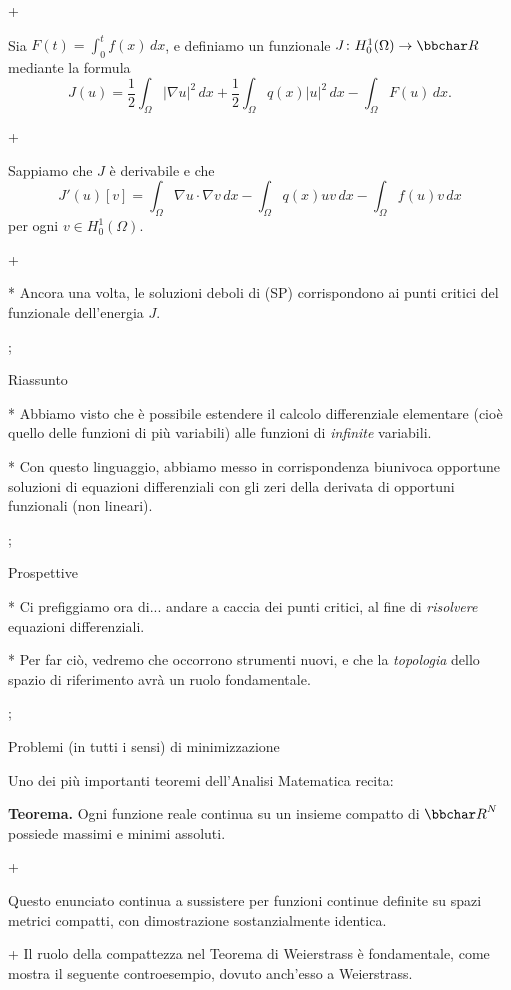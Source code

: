\pg+

Sia $F(t) = \int_0^t f(x)\, dx$, e definiamo un funzionale $J \colon
H_0^1(\Omega) \to \R$ mediante la formula
$$
J(u) = \frac{1}{2} \int_\Omega |\nabla u|^2 \, dx + \frac12
\int_\Omega q(x)|u|^2 \, dx - \int_\Omega F(u)\, dx.
$$

\pg+

Sappiamo che $J$ \`e derivabile e che
$$
J'(u)[v] = \int_\Omega \nabla u \cdot \nabla v \, dx - \int_\Omega
q(x) uv\, dx - \int_\Omega f(u)v\, dx
$$
per ogni $v \in H_0^1(\Omega)$.

\pg+

* Ancora una volta, le soluzioni deboli di (SP) corrispondono ai punti
  critici del funzionale dell'energia $J$.

\pg;

\sec Riassunto

* Abbiamo visto che \`e possibile estendere il calcolo differenziale
elementare (cio\`e quello delle funzioni di pi\`u variabili) alle
funzioni di {\em infinite} variabili.

* Con questo linguaggio, abbiamo messo in corrispondenza biunivoca
  opportune soluzioni di equazioni differenziali con gli zeri della
  derivata di opportuni funzionali (non lineari).

\pg;

\sec Prospettive

* Ci prefiggiamo ora di... andare a caccia dei punti critici, al fine
  di {\em risolvere} equazioni differenziali.

* Per far ci\`o, vedremo che occorrono strumenti nuovi, e che la {\em
  topologia} dello spazio di riferimento avr\`a un ruolo fondamentale.

\pg;

\sec Problemi (in tutti i sensi) di minimizzazione

Uno dei pi\`u importanti teoremi dell'Analisi Matematica recita:

\medskip

{\bf Teorema.} Ogni funzione reale continua su un insieme compatto di $\R^N$
possiede massimi e minimi assoluti.

\pg+

Questo enunciato continua a sussistere per funzioni continue definite
su spazi metrici compatti, con dimostrazione sostanzialmente identica.

\pg+ Il ruolo della compattezza nel Teorema di Weierstrass \`e
fondamentale, come mostra il seguente controesempio, dovuto anch'esso
a Weierstrass.

